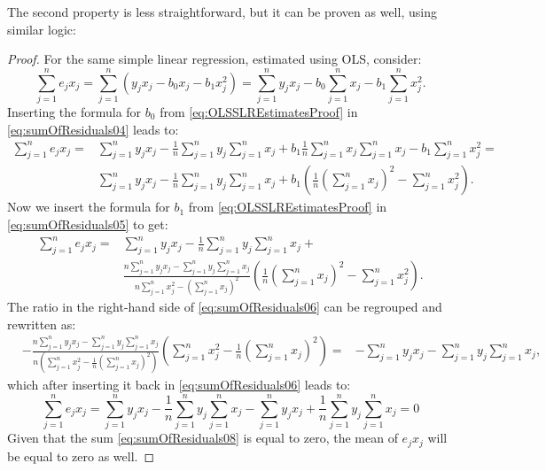 \documentclass[
]{book}
\theoremstyle{definition}
\theoremstyle{definition}
\theoremstyle{definition}
\theoremstyle{definition}
\theoremstyle{remark}
\begin{document}
The second property is less straightforward, but it can be proven as well, using similar logic:

\begin{proof}
For the same simple linear regression, estimated using OLS, consider:
\begin{equation}
    \sum_{j=1}^n e_j x_j = \sum_{j=1}^n (y_j x_j -b_0 x_j -b_1 x_j^2) = \sum_{j=1}^n y_j x_j -b_0 \sum_{j=1}^n x_j -b_1 \sum_{j=1}^n x_j^2 .
    \label{eq:sumOfResiduals04}
\end{equation}
Inserting the formula for \(b_0\) from \eqref{eq:OLSSLREstimatesProof} in \eqref{eq:sumOfResiduals04} leads to:
\begin{equation}
    \begin{aligned}
        \sum_{j=1}^n e_j x_j = & \sum_{j=1}^n y_j x_j - \frac{1}{n}\sum_{j=1}^n y_j \sum_{j=1}^n x_j + b_1 \frac{1}{n}\sum_{j=1}^n x_j \sum_{j=1}^n x_j - b_1 \sum_{j=1}^n x_j^2 = \\
                               & \sum_{j=1}^n y_j x_j - \frac{1}{n}\sum_{j=1}^n y_j \sum_{j=1}^n x_j + b_1 \left( \frac{1}{n} \left(\sum_{j=1}^n x_j \right)^2 - \sum_{j=1}^n x_j^2 \right) .
    \end{aligned}
    \label{eq:sumOfResiduals05}
\end{equation}
Now we insert the formula for \(b_1\) from \eqref{eq:OLSSLREstimatesProof} in \eqref{eq:sumOfResiduals05} to get:
\begin{equation}
    \begin{aligned}
        \sum_{j=1}^n e_j x_j = & \sum_{j=1}^n y_j x_j - \frac{1}{n}\sum_{j=1}^n y_j \sum_{j=1}^n x_j + \\
         & \frac{n \sum_{j=1}^n y_j x_j - \sum_{j=1}^n y_j \sum_{j=1}^n x_j}{n \sum_{j=1}^n x_j^2 - \left(\sum_{j=1}^n x_j \right)^2} \left( \frac{1}{n} \left(\sum_{j=1}^n x_j \right)^2 - \sum_{j=1}^n x_j^2 \right) .
    \end{aligned}
    \label{eq:sumOfResiduals06}
\end{equation}
The ratio in the right-hand side of \eqref{eq:sumOfResiduals06} can be regrouped and rewritten as:
\begin{equation}
    \begin{aligned}
        & -\frac{n \sum_{j=1}^n y_j x_j - \sum_{j=1}^n y_j \sum_{j=1}^n x_j}{n \left( \sum_{j=1}^n x_j^2 - \frac{1}{n}\left(\sum_{j=1}^n x_j \right)^2 \right)} \left( \sum_{j=1}^n x_j^2 - \frac{1}{n} \left(\sum_{j=1}^n x_j\right)^2 \right) =
        & - \sum_{j=1}^n y_j x_j - \sum_{j=1}^n y_j \sum_{j=1}^n x_j,
    \end{aligned}
    \label{eq:sumOfResiduals07}
\end{equation}
which after inserting it back in \eqref{eq:sumOfResiduals06} leads to:
\begin{equation}
    \sum_{j=1}^n e_j x_j = \sum_{j=1}^n y_j x_j - \frac{1}{n}\sum_{j=1}^n y_j \sum_{j=1}^n x_j - \sum_{j=1}^n y_j x_j + \frac{1}{n} \sum_{j=1}^n y_j \sum_{j=1}^n x_j = 0
    \label{eq:sumOfResiduals08}
\end{equation}
Given that the sum \eqref{eq:sumOfResiduals08} is equal to zero, the mean of \(e_j x_j\) will be equal to zero as well.
\end{proof}
\end{document}
